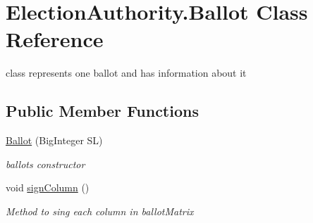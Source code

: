 \hypertarget{class_election_authority_1_1_ballot}{}\section{Election\+Authority.\+Ballot Class Reference}
\label{class_election_authority_1_1_ballot}


class represents one ballot and has information about it  


\subsection*{Public Member Functions}
\begin{DoxyCompactItemize}
\item 
\hyperlink{class_election_authority_1_1_ballot_adf2bd5aa976f9621fbf41be8dc90cde3}{Ballot} (Big\+Integer S\+L)
\begin{DoxyCompactList}\small\item\em ballot\textquotesingle{}s constructor \end{DoxyCompactList}\item 
void \hyperlink{class_election_authority_1_1_ballot_a46f6344c3df065147f3e5ea96ced555e}{sign\+Column} ()
\begin{DoxyCompactList}\small\item\em Method to sing each column in ballot\+Matrix \end{DoxyCompactList}\end{DoxyCompactItemize}
